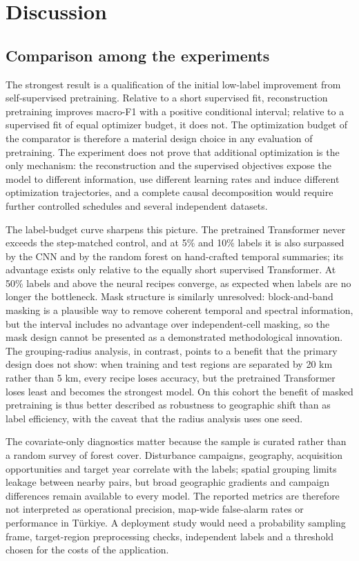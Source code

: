 \documentclass[11pt,a4paper]{article}
\begin{document}
\section{Discussion}
\subsection{Comparison among the experiments}
The strongest result is a qualification of the initial low-label improvement from self-supervised pretraining. Relative to a short supervised fit, reconstruction pretraining improves macro-F1 with a positive conditional interval; relative to a supervised fit of equal optimizer budget, it does not. The optimization budget of the comparator is therefore a material design choice in any evaluation of pretraining. The experiment does not prove that additional optimization is the only mechanism: the reconstruction and the supervised objectives expose the model to different information, use different learning rates and induce different optimization trajectories, and a complete causal decomposition would require further controlled schedules and several independent datasets.

The label-budget curve sharpens this picture. The pretrained Transformer never exceeds the step-matched control, and at 5\% and 10\% labels it is also surpassed by the CNN and by the random forest on hand-crafted temporal summaries; its advantage exists only relative to the equally short supervised Transformer. At 50\% labels and above the neural recipes converge, as expected when labels are no longer the bottleneck. Mask structure is similarly unresolved: block-and-band masking is a plausible way to remove coherent temporal and spectral information, but the interval includes no advantage over independent-cell masking, so the mask design cannot be presented as a demonstrated methodological innovation. The grouping-radius analysis, in contrast, points to a benefit that the primary design does not show: when training and test regions are separated by 20 km rather than 5 km, every recipe loses accuracy, but the pretrained Transformer loses least and becomes the strongest model. On this cohort the benefit of masked pretraining is thus better described as robustness to geographic shift than as label efficiency, with the caveat that the radius analysis uses one seed.

The covariate-only diagnostics matter because the sample is curated rather than a random survey of forest cover. Disturbance campaigns, geography, acquisition opportunities and target year correlate with the labels; spatial grouping limits leakage between nearby pairs, but broad geographic gradients and campaign differences remain available to every model. The reported metrics are therefore not interpreted as operational precision, map-wide false-alarm rates or performance in Türkiye. A deployment study would need a probability sampling frame, target-region preprocessing checks, independent labels and a threshold chosen for the costs of the application.
\end{document}
